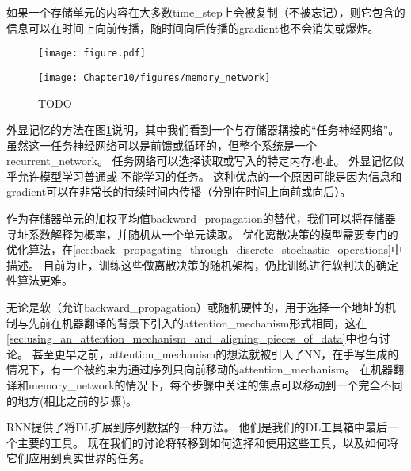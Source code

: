 如果一个存储单元的内容在大多数\gls{time_step}上会被复制（不被忘记），则它包含的信息可以在时间上向前传播，随时间向后传播的\gls{gradient}也不会消失或爆炸。

\begin{figure}[!htb]
\ifOpenSource
\centerline{\texttt{[image: figure.pdf]}}
\else
\centerline{\texttt{[image: Chapter10/figures/memory\_network]}}
\fi
\caption{TODO}
\label{fig:chap10_memory_network}
\end{figure}

外显记忆的方法在图\ref{fig:chap10_memory_network}说明，其中我们看到一个与存储器耦接的``任务神经网络''。
虽然这一任务神经网络可以是前馈或循环的，但整个系统是一个\gls{recurrent_network}。
任务网络可以选择读取或写入的特定内存地址。
外显记忆似乎允许模型学习普通或 不能学习的任务。
这种优点的一个原因可能是因为信息和\gls{gradient}可以在非常长的持续时间内传播（分别在时间上向前或向后）。


作为存储器单元的加权平均值\gls{backward_propagation}的替代，我们可以将存储器寻址系数解释为概率，并随机从一个单元读取\citep{Zaremba+Sutskever-arxiv2015}。
优化离散决策的模型需要专门的优化算法，在\ref{sec:back_propagating_through_discrete_stochastic_operations}中描述。
目前为止，训练这些做离散决策的随机架构，仍比训练进行软判决的确定性算法更难。

无论是软（允许\gls{backward_propagation}）或随机硬性的，用于选择一个地址的机制与先前在机器翻译的背景下引入的\gls{attention_mechanism}形式相同\citep{Bahdanau-et-al-ICLR2015-small}，这在\ref{sec:using_an_attention_mechanism_and_aligning_pieces_of_data}中也有讨论。
甚至更早之前，\gls{attention_mechanism}的想法就被引入了\gls{NN}，在手写生成的情况下\citep{Graves-arxiv2013}，有一个被约束为通过序列只向前移动的\gls{attention_mechanism}。
在机器翻译和\gls{memory_network}的情况下，每个步骤中关注的焦点可以移动到一个完全不同的地方(相比之前的步骤)。

\gls{RNN}提供了将\gls{DL}扩展到序列数据的一种方法。
他们是我们的\gls{DL}工具箱中最后一个主要的工具。
现在我们的讨论将转移到如何选择和使用这些工具，以及如何将它们应用到真实世界的任务。
